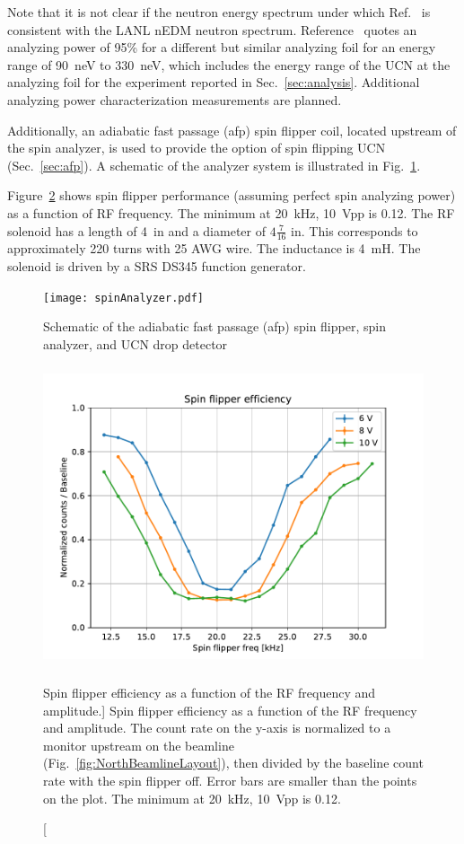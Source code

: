 Note that it is not clear if the neutron energy spectrum under which Ref.~\cite{ThorstenThesis} is consistent with the LANL nEDM neutron spectrum. Reference~\cite{afach_device_2015} quotes an analyzing power of 95\% for a different but similar analyzing foil for an energy range of 90~neV to 330~neV, which includes the energy range of the UCN at the analyzing foil for the experiment reported in Sec.~\ref{sec:analysis}. Additional analyzing power characterization measurements are planned.

Additionally, an adiabatic fast passage (\acrshort{afp}) spin flipper coil, located upstream of the spin analyzer, is used to provide the option of spin flipping UCN (Sec.~\ref{sec:afp}). A schematic of the analyzer system is illustrated in Fig.~\ref{fig:SpinAnalyzer}.

Figure~\ref{fig:spin_flipper_efficiency} shows spin flipper performance (assuming perfect spin analyzing power) as a function of RF frequency. The minimum at \qty{20}{kHz}, \qty{10}{Vpp} is 0.12. The RF solenoid has a length of \qty{4}{in} and a diameter of $4\frac{7}{16}\text{ in}$. This corresponds to approximately 220 turns with 25 AWG wire. The inductance is \qty{4}{mH}. The solenoid is driven by a SRS DS345 function generator.


\begin{figure}
    \centering
    \texttt{[image: spinAnalyzer.pdf]}
    \caption{Schematic of the adiabatic fast passage (\acrshort{afp}) spin flipper, spin analyzer, and UCN drop detector}
    \label{fig:SpinAnalyzer}
\end{figure}

\begin{figure}
    \centering
    \includegraphics[height=3.5in]{figures/spin_flipper_efficiency.pdf}
    \caption
    [Spin flipper efficiency as a function of the RF frequency and amplitude.]
    {Spin flipper efficiency as a function of the RF frequency and amplitude. The count rate on the y-axis is normalized to a monitor upstream on the beamline (Fig.~\ref{fig:NorthBeamlineLayout}), then divided by the baseline count rate with the spin flipper off. Error bars are smaller than the points on the plot. The minimum at \qty{20}{kHz}, \qty{10}{Vpp} is 0.12.}
    \label{fig:spin_flipper_efficiency}
\end{figure}

